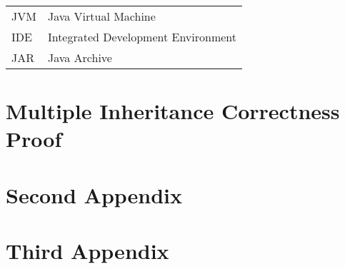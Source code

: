 \documentclass[inscr,ack,preface]{diphdthesis}
\begin{document}

\backmatter


\abbreviations
\begin{center}
	\renewcommand{\arraystretch}{1.5}
	\begin{longtable}{ l @{\qquad} l }
      \toprule
      JVM    & Java Virtual Machine \\
      IDE    & Integrated Development Environment \\
      JAR    & Java Archive \\
      \bottomrule
	\end{longtable}
\end{center}



\begin{appendix}
\appendixstartedtrue

{}

\chapter{Multiple Inheritance Correctness Proof}


\chapter{Second Appendix}
\chapter{Third Appendix}
\end{appendix}



\printbibliography[title={References}]
\end{document}
